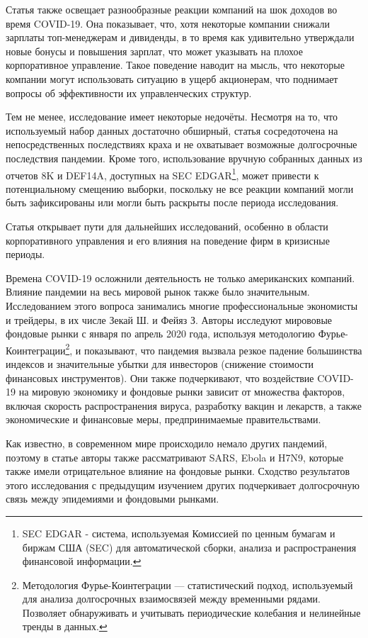 \documentclass[14pt]{extarticle}
\begin{document}
Статья также освещает разнообразные реакции компаний на шок доходов во время COVID-19. Она показывает, что, хотя некоторые компании снижали зарплаты топ-менеджерам и дивиденды, в то время как удивительно утверждали новые бонусы и повышения зарплат, что может указывать на плохое корпоративное управление. Такое поведение наводит на мысль, что некоторые компании могут использовать ситуацию в ущерб акционерам, что поднимает вопросы об эффективности их управленческих структур.

Тем не менее, исследование имеет некоторые недочёты. Несмотря на то, что используемый набор данных достаточно обширный, статья сосредоточена на непосредственных последствиях краха и не охватывает возможные долгосрочные последствия пандемии. Кроме того, использование вручную собранных данных из отчетов 8K и DEF14A, доступных на SEC EDGAR\footnote{SEC EDGAR - система, используемая Комиссией по ценным бумагам и биржам США (SEC) для автоматической сборки, анализа и распространения финансовой информации.}, может привести к потенциальному смещению выборки, поскольку не все реакции компаний могли быть зафиксированы или могли быть раскрыты после периода исследования.

Статья открывает пути для дальнейших исследований, особенно в области корпоративного управления и его влияния на поведение фирм в кризисные периоды.

Времена COVID-19 осложнили деятельность не только американских компаний. Влияние пандемии на весь мировой рынок также было значительным. Исследованием этого вопроса занимались многие профессиональные экономисты и трейдеры, в их числе Зекай Ш. и
Фейяз З.\cite{article_721871} Авторы исследуют мирововые фондовые рынки с января по апрель 2020 года, используя методологию Фурье-Коинтеграции\footnote{Методология Фурье-Коинтеграции — статистический подход, используемый для анализа долгосрочных взаимосвязей между временными рядами. Позволяет обнаруживать и учитывать периодические колебания и нелинейные тренды в данных.}, и показывают, что пандемия вызвала резкое падение большинства индексов и значительные убытки для инвесторов (снижение стоимости финансовых инструментов). Они также подчеркивают, что воздействие COVID-19 на мировую экономику и фондовые рынки зависит от множества факторов, включая скорость распространения вируса, разработку вакцин и лекарств, а также экономические и финансовые меры, предпринимаемые правительствами.

Как известно, в современном мире происходило немало других пандемий, поэтому в статье авторы также рассматривают SARS, Ebola и H7N9, которые также имели отрицательное влияние на фондовые рынки. Сходство результатов этого исследования с предыдущим изучением других  подчеркивает долгосрочную связь между эпидемиями и фондовыми рынками.
\end{document}
